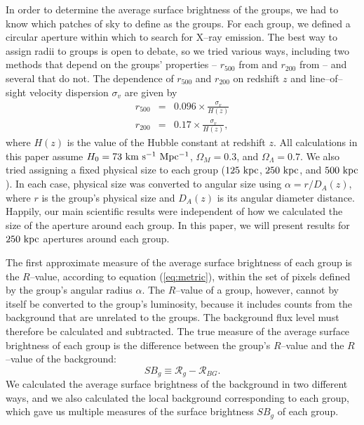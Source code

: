 \documentclass[12pt,preprint]{aastex}
\newcommand{\R}[0]{\mathcal{R}}
\begin{document}
In order to determine the average surface brightness of the groups, we had
to know which patches of sky to define as the groups.  For each group, we
defined a circular aperture within which to search for X--ray emission.  
The best way to assign radii to groups is open to debate,
so we tried various ways, including two methods that depend on the
groups' properties -- $r_{500}$ from \citet{osmond+ponman2004} and $r_{200}$
from \citet{mahdavi+geller2004} -- and several that do not.
The dependence
of $r_{500}$ and $r_{200}$ on redshift $z$ and line--of--sight velocity
dispersion $\sigma_v$ are given by
\begin{eqnarray}
\label{eq:r500}
r_{500} & = & 0.096 \times \frac{\sigma_v}{H(z)} \\
\label{eq:r200}
r_{200} & = & 0.17 \times \frac{\sigma_v}{H(z)},
\end{eqnarray}
where $H(z)$ is the value of the Hubble constant at redshift $z$.  All
calculations in this paper assume $H_0 = 73 {\rm~km~s^{-1}~Mpc^{-1}}$,
$\Omega_M = 0.3$, and $\Omega_\Lambda = 0.7$.  We also tried assigning a
fixed physical size to each group ($125 {\rm~kpc}$, $250 {\rm~kpc}$, and
$500 {\rm~kpc}$).  In each case, physical size was converted to angular
size using $\alpha = r/D_A(z)$, where $r$ is the group's physical size and
$D_A(z)$ is its angular diameter distance.
Happily, our main scientific results were independent of how we calculated
the size of the aperture around each group.  In this paper, we will present
results for $250 {\rm~kpc}$ apertures around each group.

The first approximate measure
of the average surface brightness of each group is the $R$--value,
according to equation (\ref{eq:metric}), within the set of pixels defined
by the group's angular radius $\alpha$.  
The $R$--value of a group, however, cannot by itself be converted to the
group's luminosity, because it includes counts from the background
that are unrelated to the groups.  The background flux level must
therefore be calculated and subtracted.  The true measure of the
average surface brightness of each group is the difference between the
group's $R$--value and the $R$--value of the background: 
\begin{equation}
\label{eq:brightness}
SB_g \equiv \R_g - \R_{BG}.
\end{equation}
We calculated the average surface brightness of the background in two
different ways, and we also calculated the local background corresponding to
each group, which gave us multiple measures of the surface brightness $SB_g$
of each group.
\end{document}
